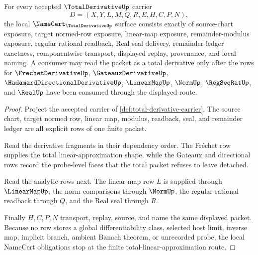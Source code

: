 \begin{theorem}
\label{thm:total-derivative-namecert-obligations}
For every accepted $\TotalDerivativeUp$ carrier
$$
D=(X,Y,L,M,Q,R,E,H,C,P,N),
$$
the local $\NameCert_{\TotalDerivativeUp}$ surface consists exactly of source-chart exposure, target normed-row exposure, linear-map exposure, remainder-modulus exposure, regular rational readback, Real seal delivery, remainder-ledger exactness, componentwise transport, displayed replay, provenance, and local naming. A consumer may read the packet as a total derivative only after the rows for $\FrechetDerivativeUp$, $\GateauxDerivativeUp$, $\HadamardDirectionalDerivativeUp$, $\LinearMapUp$, $\NormUp$, $\RegSeqRatUp$, and $\RealUp$ have been consumed through the displayed route.
\end{theorem}
\begin{proof}
Project the accepted carrier of \autoref{def:total-derivative-carrier}. The source chart, target normed row, linear map, modulus, readback, seal, and remainder ledger are all explicit rows of one finite packet.

Read the derivative fragments in their dependency order. The Fréchet row supplies the total linear-approximation shape, while the Gateaux and directional rows record the probe-level faces that the total packet refuses to leave detached.

Read the analytic rows next. The linear-map row $L$ is supplied through $\LinearMapUp$, the norm comparisons through $\NormUp$, the regular rational readback through $Q$, and the Real seal through $R$.

Finally $H,C,P,N$ transport, replay, source, and name the same displayed packet. Because no row stores a global differentiability class, selected host limit, inverse map, implicit branch, ambient Banach theorem, or unrecorded probe, the local NameCert obligations stop at the finite total-linear-approximation route.
\end{proof}

